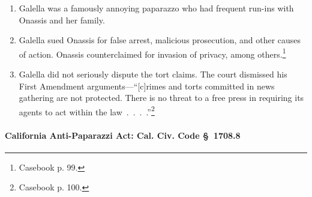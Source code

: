 \begin{enumerate}
    \item Galella was a famously annoying paparazzo who had frequent run-ins 
    with Onassis and her family.
    \item Galella sued Onassis for false arrest, malicious prosecution, and 
    other causes of action. Onassis counterclaimed for invasion of privacy, 
    among others.\footnote{Casebook p. 99.}
    \item Galella did not seriously dispute the tort claims. The court dismissed 
    his First Amendment arguments---``[c]rimes and torts committed in news 
    gathering are not protected. There is no threat to a free press in requiring 
    its agents to act within the law~.~.~.~.''\footnote{Casebook p. 100.}
\end{enumerate}

\paragraph{California Anti-Paparazzi Act: Cal. Civ. Code \S\ 1708.8}
\label{par:cal-paparazzi}

